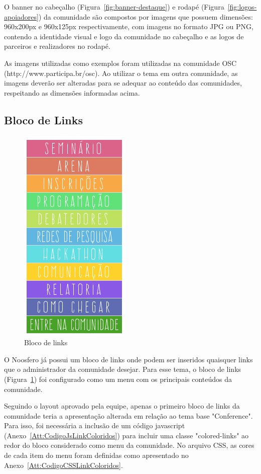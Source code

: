 \documentclass[[a4paper,11pt]{article}
\begin{document}
O banner no cabeçalho (Figura~\ref{fig:banner-destaque}) e rodapé
(Figura~\ref{fig:logos-apoiadores}) da comunidade são compostos por imagens que
possuem dimensões: 960x200px e 960x125px respectivamente, com imagens
no formato JPG ou PNG, contendo a identidade visual e logo da comunidade no
cabeçalho e as logos de parceiros e realizadores no rodapé.

As imagens utilizadas como exemplos foram utilizadas na comunidade OSC
(http://www.participa.br/osc). Ao utilizar o tema em outra comunidade, as
imagens deverão ser alteradas para se adequar ao conteúdo das comunidades,
respeitando as dimensões informadas acima. 

\subsection{Bloco de Links}

\begin{figure}[h]
\center
\includegraphics[scale=0.4]{bloco-links.png}
\caption{Bloco de links}
\label{fig:bloco-links}
\end{figure}

O Noosfero já possui um bloco de links onde podem ser inseridos quaisquer links
que o administrador da comunidade desejar. Para esse tema, o bloco de links
(Figura~\ref{fig:bloco-links}) foi configurado como um menu com os principais
conteúdos da comunidade.

Seguindo o layout aprovado pela equipe, apenas o primeiro bloco de links da comunidade teria a
apresentação alterada em relação ao tema base "Conference". Para isso, foi
necessária a inclusão de um código javascript
(Anexo~\ref{Att:CodigoJsLinkColoridos}) para incluir uma classe "colored-links" ao redor
do bloco considerado como menu da comunidade. No arquivo CSS, as cores de cada
item do menu foram definidas como apresentado no
Anexo~\ref{Att:CodigoCSSLinkColoridos}.
\end{document}
